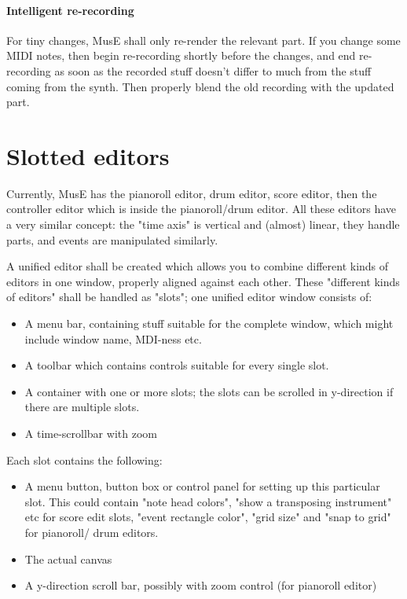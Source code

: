 \documentclass[a4paper]{report}
\begin{document}
\paragraph{Intelligent re-recording}
For tiny changes, MusE shall only re-render the relevant part. If you
change some MIDI notes, then begin re-recording shortly before the
changes, and end re-recording as soon as the recorded stuff doesn't
differ to much from the stuff coming from the synth. Then properly
blend the old recording with the updated part.



\section{Slotted editors}
Currently, MusE has the pianoroll editor, drum editor, score editor,
then the controller editor which is inside the pianoroll/drum editor.
All these editors have a very similar concept: the "time axis" is
vertical and (almost) linear, they handle parts, and events are
manipulated similarly.

A unified editor shall be created which allows you to combine different
kinds of editors in one window, properly aligned against each other.
These "different kinds of editors" shall be handled as "slots"; one
unified editor window consists of:
\begin{itemize}
\item A menu bar, containing stuff suitable for the complete window,
      which might include window name, MDI-ness etc.
\item A toolbar which contains controls suitable for every single slot.
\item A container with one or more slots; the slots can be scrolled in
      y-direction if there are multiple slots.
\item A time-scrollbar with zoom
\end{itemize}

Each slot contains the following:
\begin{itemize}
\item A menu button, button box or control panel for setting up this
      particular slot. This could contain "note head colors", "show
      a transposing instrument" etc for score edit slots, "event
      rectangle color", "grid size" and "snap to grid" for pianoroll/
      drum editors.
\item The actual canvas
\item A y-direction scroll bar, possibly with zoom control (for
      pianoroll editor)
\end{itemize}
\end{document}
